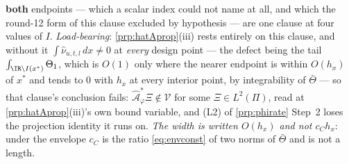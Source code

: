 \begin{lemma}
\begin{enumerate}
\textbf{both} endpoints --- which a scalar index could not name at all, and which the round-12 form of
this clause excluded by hypothesis --- are one clause at four values of $I$.
\emph{Load-bearing}:
\cref{prp:hatAprop}(iii) rests entirely on this clause, and without it $\int\hat\nu_{u,t,l}\,dx\ne0$ at
\emph{every} design point --- the defect being the tail $\int_{\IR\setminus I(x^\ast)}\Theta_1$, which is
$O(1)$ only where the nearer endpoint is within $O(h_x)$ of $x^\ast$ and tends to $0$ with $h_x$ at every
interior point, by integrability of $\bar\Theta$ --- so that clause's conclusion fails:
$\hat{\mathcal A}^\ast_\varphi\Xi\notin\mathcal V$ for some $\Xi\in L^{2}(\Pi)$, read at
\cref{prp:hatAprop}\textup{(iii)}'s own bound variable, and (L2) of \cref{prp:phirate} Step~2 loses the
projection identity it runs on.
\emph{The width is written $O(h_x)$ and not $c_Ch_x$}: under the envelope $c_C$ is the ratio
\eqref{eq:envconst} of two norms of $\bar\Theta$ and is not a length.
\end{enumerate}
\end{lemma}

